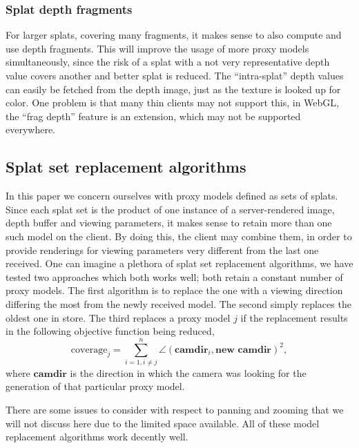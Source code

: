 \subsubsection{Splat depth fragments}

For larger splats, covering many fragments, it makes sense to also compute and
use depth fragments. This will improve the usage of more proxy models
simultaneously, since the risk of a splat with a not very representative depth
value covers another and better splat is reduced. The ``intra-splat'' depth
values can easily be fetched from the depth image, just as the texture is looked
up for color. One problem is that many thin clients may not support this, in
WebGL, the ``frag depth'' feature is an extension, which may not be supported
everywhere.


\subsection{Splat set replacement algorithms}
\label{sec:proxyModelReplacement}

In this paper we concern ourselves with proxy models defined as sets of
splats. Since each splat set is the product of one instance of a server-rendered
image, depth buffer and viewing parameters, it makes sense to retain more than
one such model on the client. By doing this, the client may combine them, in
order to provide renderings for viewing parameters very different from the last
one received. One can imagine a plethora of splat set replacement algorithms, we
have tested two approaches which both works well; both retain a constant number
of proxy models. The first algorithm is to replace the one with a viewing
direction differing the most from the newly received model. The second simply
replaces the oldest one in store. The third replaces a proxy model $j$ if the
replacement results in the following objective function being reduced,
\[
  \text{coverage}_j = 
  \sum_{i=1, i\neq j}^n 
    \angle(\textbf{camdir}_i, \textbf{new camdir} )^2,
\]
where $\textbf{camdir}$ is the direction in which the camera was looking for the
generation of that particular proxy model.

There are some issues to consider with respect to panning and zooming that we
will not discuss here due to the limited space available.  All of these model
replacement algorithms work decently well.



